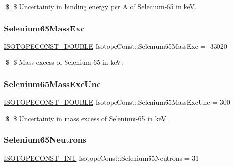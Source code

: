 \$ \$ Uncertainty in binding energy per A of Selenium-\/65 in keV. \mbox{\label{group___isotope_const-_selenium-_se65_gac1a0112106c4aa2f5e4a5cdc00a9a50c}} 
\subsubsection{\texorpdfstring{Selenium65\+Mass\+Exc}{Selenium65MassExc}}
{\footnotesize\ttfamily \mbox{\hyperlink{group___isotope_const-_macros_ga8f45a7272ce02c0b4c65c44636ed719a}{I\+S\+O\+T\+O\+P\+E\+C\+O\+N\+S\+T\+\_\+\+D\+O\+U\+B\+LE}} Isotope\+Const\+::\+Selenium65\+Mass\+Exc = -\/33020}

\$ \$ Mass excess of Selenium-\/65 in keV. \mbox{\label{group___isotope_const-_selenium-_se65_ga27c718971245554e2eec3831d33878a4}} 
\subsubsection{\texorpdfstring{Selenium65\+Mass\+Exc\+Unc}{Selenium65MassExcUnc}}
{\footnotesize\ttfamily \mbox{\hyperlink{group___isotope_const-_macros_ga8f45a7272ce02c0b4c65c44636ed719a}{I\+S\+O\+T\+O\+P\+E\+C\+O\+N\+S\+T\+\_\+\+D\+O\+U\+B\+LE}} Isotope\+Const\+::\+Selenium65\+Mass\+Exc\+Unc = 300}

\$ \$ Uncertainty in mass excess of Selenium-\/65 in keV. \mbox{\label{group___isotope_const-_selenium-_se65_ga32d73d30c1a922f7a814b7a4b96ffa7a}} 
\subsubsection{\texorpdfstring{Selenium65\+Neutrons}{Selenium65Neutrons}}
{\footnotesize\ttfamily \mbox{\hyperlink{group___isotope_const-_macros_ga5f18360b3e99483a35c32d789e62621c}{I\+S\+O\+T\+O\+P\+E\+C\+O\+N\+S\+T\+\_\+\+I\+NT}} Isotope\+Const\+::\+Selenium65\+Neutrons = 31}

